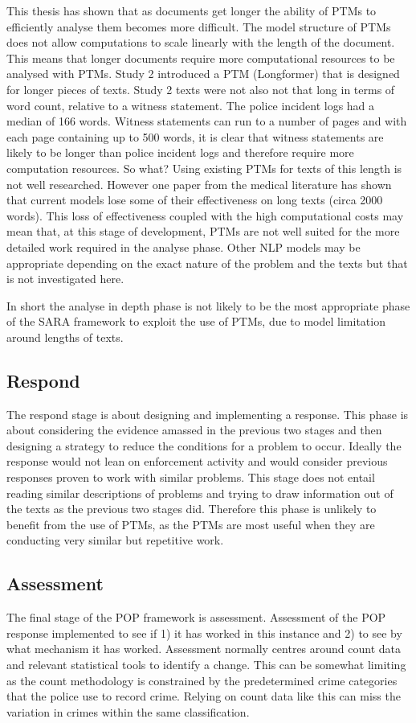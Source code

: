 This thesis has shown that as documents get longer the ability of PTMs to efficiently analyse them becomes more difficult. The model structure of PTMs does not allow computations to scale linearly with the length of the document. This means that longer documents require more computational resources to be analysed with PTMs. Study 2 introduced a PTM (Longformer) that is designed for longer pieces of texts. Study 2 texts were not also not that long in terms of word count, relative to a witness statement. The police incident logs had a median of 166 words. Witness statements can run to a number of pages and with each page containing up to 500 words, it is clear that witness statements are likely to be longer than police incident logs and therefore require more computation resources. So what? Using existing PTMs for texts of this length is not well researched. However one paper from the medical literature \parencite{limitations_of_transformers} has shown that current models lose some of their effectiveness on long texts (circa 2000 words). This loss of effectiveness coupled with the high computational costs may mean that, at this stage of development, PTMs are not well suited for the more detailed work required in the analyse phase. Other NLP models may be appropriate depending on the exact nature of the problem and the texts but that is not investigated here. 

In short the analyse in depth phase is not likely to be the most appropriate phase of the SARA framework to exploit the use of PTMs, due to model limitation around lengths of texts.


\subsection{Respond} The respond stage is about designing and implementing a response. This phase is about considering the evidence amassed in the previous two stages and then designing a strategy to reduce the conditions for a problem to occur. Ideally the response would not lean on enforcement activity and would consider previous responses proven to work with similar problems. This stage does not entail reading similar descriptions of problems and trying to draw information out of the texts as the previous two stages did. Therefore this phase is unlikely to benefit from the use of PTMs, as the PTMs are most useful when they are conducting very similar but repetitive work.  

  
\subsection{Assessment} The final stage of the POP framework is assessment. Assessment of the POP response implemented to see if 1) it has worked in this instance and 2) to see by what mechanism it has worked. Assessment normally centres around count data and relevant statistical tools to identify a change. This can be somewhat limiting as the count methodology is constrained by the predetermined crime categories that the police use to record crime. Relying on count data like this can miss the variation in crimes within the same classification. 

